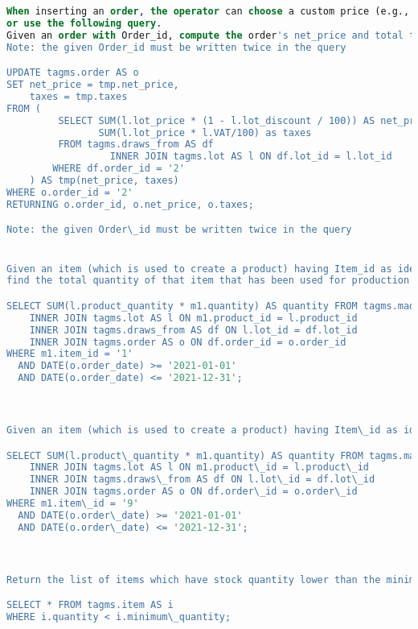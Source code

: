 \begin{lstlisting}[language=SQL,
keywordstyle=\color{blue},
stringstyle=\color{mauve},
showstringspaces=false,
basicstyle=\ttfamily\footnotesize]
When inserting an order, the operator can choose a custom price (e.g., decided with the customer)
or use the following query.
Given an order with Order_id, compute the order's net_price and total taxes.
Note: the given Order_id must be written twice in the query

UPDATE tagms.order AS o
SET net_price = tmp.net_price,
    taxes = tmp.taxes
FROM (
         SELECT SUM(l.lot_price * (1 - l.lot_discount / 100)) AS net_price,
                SUM(l.lot_price * l.VAT/100) as taxes
         FROM tagms.draws_from AS df
                  INNER JOIN tagms.lot AS l ON df.lot_id = l.lot_id
        WHERE df.order_id = '2'
    ) AS tmp(net_price, taxes)
WHERE o.order_id = '2'
RETURNING o.order_id, o.net_price, o.taxes;

Note: the given Order\_id must be written twice in the query


Given an item (which is used to create a product) having Item_id as identifier and a time interval (actually, two dates),
find the total quantity of that item that has been used for production or packaging during that time.

SELECT SUM(l.product_quantity * m1.quantity) AS quantity FROM tagms.made_up_of_1 AS m1
    INNER JOIN tagms.lot AS l ON m1.product_id = l.product_id
    INNER JOIN tagms.draws_from AS df ON l.lot_id = df.lot_id
    INNER JOIN tagms.order AS o ON df.order_id = o.order_id
WHERE m1.item_id = '1'
  AND DATE(o.order_date) >= '2021-01-01'
  AND DATE(o.order_date) <= '2021-12-31';



Given an item (which is used to create a product) having Item\_id as identifier and a time interval (actually, two dates), find the total quantity of that item that has been used for production or packaging during that time.

SELECT SUM(l.product\_quantity * m1.quantity) AS quantity FROM tagms.made\_up\_of\_1 AS m1
    INNER JOIN tagms.lot AS l ON m1.product\_id = l.product\_id
    INNER JOIN tagms.draws\_from AS df ON l.lot\_id = df.lot\_id
    INNER JOIN tagms.order AS o ON df.order\_id = o.order\_id
WHERE m1.item\_id = '9'
  AND DATE(o.order\_date) >= '2021-01-01'
  AND DATE(o.order\_date) <= '2021-12-31';



Return the list of items which have stock quantity lower than the minimum one.

SELECT * FROM tagms.item AS i
WHERE i.quantity < i.minimum\_quantity;





\end{lstlisting}
